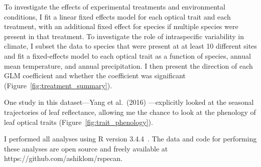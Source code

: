 To investigate the effects of experimental treatments and environmental conditions, I fit a linear fixed effects model for each optical trait and each treatment, with an additional fixed effect for species if multiple species were present in that treatment.
To investigate the role of intraspecific variability in climate, I subset the data to species that were present at at least 10 different sites and fit a fixed-effects model to each optical trait as a function of species, annual mean temperature, and annual precipitation.
I then present the direction of each GLM coefficient and whether the coefficient was significant (Figure~\ref{fig:treatment_summary}).

One study in this dataset---Yang et al.~(2016) \nocite{yang_2016_seasonal}---explicitly looked at the seasonal trajectories of leaf reflectance, allowing me the chance to look at the phenology of leaf optical traits (Figure~\ref{fig:trait_phenology}).


I performed all analyses using R version 3.4.4~\cite{rstats}.
The data and code for performing these analyses are open source and freely available at https://github.com/ashiklom/rspecan.
